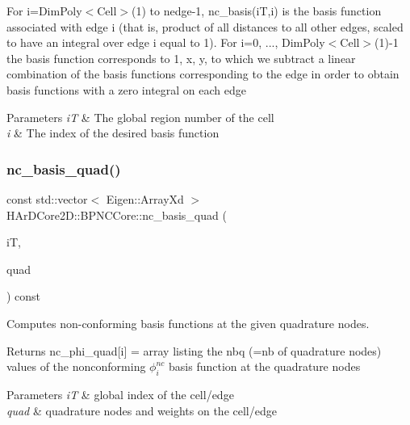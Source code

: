 For i=Dim\+Poly$<$\+Cell$>$(1) to nedge-\/1, nc\+\_\+basis(i\+T,i) is the basis function associated with edge i (that is, product of all distances to all other edges, scaled to have an integral over edge i equal to 1). For i=0, ..., Dim\+Poly$<$\+Cell$>$(1)-\/1 the basis function corresponds to 1, x, y, to which we subtract a linear combination of the basis functions corresponding to the edge in order to obtain basis functions with a zero integral on each edge 
\begin{DoxyParams}{Parameters}
{\em iT} & The global region number of the cell \\
\hline
{\em i} & The index of the desired basis function \\
\hline
\end{DoxyParams}
\mbox{\label{group__BPNC_gadab9f7a9f6d42f729a8dce8e358e4d00}} 
\subsubsection{\texorpdfstring{nc\+\_\+basis\+\_\+quad()}{nc\_basis\_quad()}}
{\footnotesize\ttfamily const std\+::vector$<$ Eigen\+::\+Array\+Xd $>$ H\+Ar\+D\+Core2\+D\+::\+B\+P\+N\+C\+Core\+::nc\+\_\+basis\+\_\+quad (\begin{DoxyParamCaption}\item[{const size\+\_\+t}]{iT,  }\item[{const Quadrature\+Rule}]{quad }\end{DoxyParamCaption}) const}



Computes non-\/conforming basis functions at the given quadrature nodes. 

\begin{DoxyReturn}{Returns}
nc\+\_\+phi\+\_\+quad\mbox{[}i\mbox{]} = array listing the nbq (=nb of quadrature nodes) values of the nonconforming $\phi^{nc}_i$ basis function at the quadrature nodes 
\end{DoxyReturn}

\begin{DoxyParams}{Parameters}
{\em iT} & global index of the cell/edge \\
\hline
{\em quad} & quadrature nodes and weights on the cell/edge \\
\hline
\end{DoxyParams}
\mbox{\label{group__BPNC_ga967af6ae54aa35135ab8edb9cb94f1cf}} 
